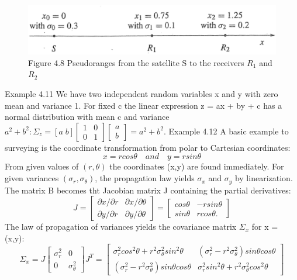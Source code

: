 \begin{figure}[h]
	\centering
	\includegraphics[width=0.7\linewidth]{TeX_files/Part02/chapter04/image/4-8}
	\caption{Figure 4.8\; Pseudoranges from the satellite S to the receivers $R_1$ and $R_2$}
	\label{fig:4-8}
\end{figure}
Example 4.11\; We have two independent random variables x and y with zero mean and variance 1. For fixed c the linear expression z = ax + by + c has a normal distribution with mean c and variance $a^2+b^2:\Sigma_z=[a\;b]\begin{bmatrix}1 & 0\\0 & 1\end{bmatrix}
\begin{bmatrix} a\\b \end{bmatrix}=a^2+b^2$.
Example 4.12\; A basic example to surveying is the coordinate transformation from polar
to Cartesian coordinates:
\begin{equation*}
x=rcos\theta \quad and \quad y=rsin\theta
\end{equation*}
From given values of $(r,\theta)$ the coordinates (x,y) are found immediately. For given variances $(\sigma_r,\sigma_\theta)$, the propagation law yields $\sigma_x$ and $\sigma_y$ by linearization. The matrix B becomes tht Jacobian matrix J containing the partial derivatives:
\begin{equation*}
J=
\begin{bmatrix}
\partial x/\partial r & \partial x/\partial \theta\\
\partial y/\partial r & \partial y/\partial \theta
\end{bmatrix}
=
\begin{bmatrix}
cos\theta &-rsin\theta \\
sin\theta &rcos\theta.
\end{bmatrix}
\end{equation*}
The law of propagation of variances yields the covariance matrix $\Sigma_x$ for x = (x,y):
\begin{equation*}
\Sigma_x=J
\begin{bmatrix}
\sigma^2_r & 0 \\
0 &\sigma^2_\theta
\end{bmatrix}
J^T=
\begin{bmatrix}
\sigma^2_rcos^2\theta+r^2\sigma^2_\theta sin^2\theta & (\sigma^2_r-r^2\sigma^2_\theta)sin\theta cos\theta\\
(\sigma^2_r-r^2\sigma^2_\theta)sin\theta cos\theta &
\sigma^2_rsin^2\theta+r^2\sigma^2_\theta cos^2\theta 
\end{bmatrix}
\end{equation*}
